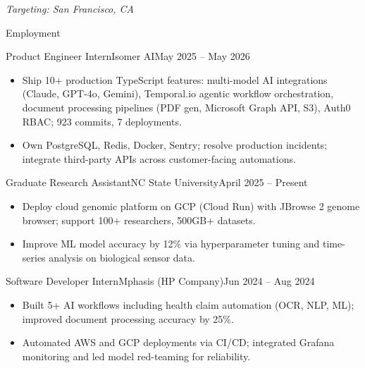 \documentclass[]{mcdowellcv}
\begin{document}
\makeheader
\begin{center}\vspace{-12pt}\small\textit{Targeting: San Francisco, CA}\end{center}\vspace{-10pt}

\begin{cvsection}{Employment}
  \begin{cvsubsection}{Product Engineer Intern}{Isomer AI}{May 2025 -- May 2026}
    \begin{itemize}
      \item Ship 10+ production TypeScript features: multi-model AI integrations (Claude, GPT-4o, Gemini), Temporal.io agentic workflow orchestration, document processing pipelines (PDF gen, Microsoft Graph API, S3), Auth0 RBAC; 923 commits, 7 deployments.
      \item Own PostgreSQL, Redis, Docker, Sentry; resolve production incidents; integrate third-party APIs across customer-facing automations.
    \end{itemize}
    \vspace{-1.5pt}
  \end{cvsubsection}

  \begin{cvsubsection}{Graduate Research Assistant}{NC State University}{April 2025 -- Present}
    \begin{itemize}
      \item Deploy cloud genomic platform on GCP (Cloud Run) with JBrowse 2 genome browser; support 100+ researchers, 500GB+ datasets.
      \item Improve ML model accuracy by 12\% via hyperparameter tuning and time-series analysis on biological sensor data.
    \end{itemize}
    \vspace{-1.5pt}
  \end{cvsubsection}

  \begin{cvsubsection}{Software Developer Intern}{Mphasis (HP Company)}{Jun 2024 -- Aug 2024}
    \begin{itemize}
      \item Built 5+ AI workflows including health claim automation (OCR, NLP, ML); improved document processing accuracy by 25\%.
      \item Automated AWS and GCP deployments via CI/CD; integrated Grafana monitoring and led model red-teaming for reliability.
    \end{itemize}
    \vspace{-1.5pt}
  \end{cvsubsection}


\end{cvsection}
\end{document}
